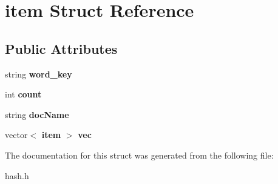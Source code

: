 \section{item Struct Reference}
\label{structitem}
\subsection*{Public Attributes}
\begin{DoxyCompactItemize}
\item 
string {\bfseries word\+\_\+key}\label{structitem_ac8277a05ff6123953e155ce6509abfbb}

\item 
int {\bfseries count}\label{structitem_a84ad511a7e7fc725743a4399fa240c61}

\item 
string {\bfseries doc\+Name}\label{structitem_ab0e6ffba7b90e2d2f248eb89ec245e75}

\item 
vector$<$ {\bf item} $>$ {\bfseries vec}\label{structitem_a9cfe089919ee381e330a884914751bff}

\end{DoxyCompactItemize}


The documentation for this struct was generated from the following file\+:\begin{DoxyCompactItemize}
\item 
hash.\+h\end{DoxyCompactItemize}
